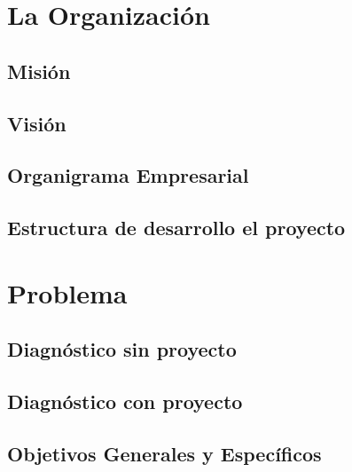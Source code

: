 \documentclass[a4paper,12pt,openany,oneside]{book}
\begin{document}
\chapter{La Organización}
\thispagestyle{empty}
\section{Misión}

\section{Visión}

\section{Organigrama Empresarial}

\section{Estructura de desarrollo el proyecto}

\chapter{Problema}
\thispagestyle{empty}
\section{Diagnóstico sin proyecto}

\section{Diagnóstico con proyecto}

\section{Objetivos Generales y Específicos}
\end{document}

